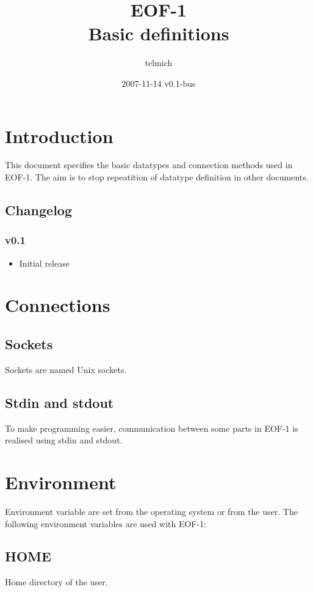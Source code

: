 \documentclass[12pt,a4paper]{article}
\begin{document}
\title{EOF-1\\Basic definitions}
\date{2007-11-14 v0.1-bus}
\author{telmich}

\maketitle
\tableofcontents

\section{Introduction}
This document specifies the basic datatypes and connection
methods used in EOF-1. The aim is to stop repeatition of
datatype definition in other documents.

\subsection{Changelog}
\subsubsection{v0.1}
\begin{itemize}
\item Initial release
\end{itemize}
\section{Connections}
\subsection{Sockets}
Sockets are named Unix sockets.
\subsection{Stdin  and stdout}
To make programming easier, communication between some parts in EOF-1 is realised
using stdin and stdout. 
\section{Environment}
Environment variable are set from the operating system or from the user.
The following environment variables are used with EOF-1:
\subsection{HOME}
Home directory of the user.
\end{document}
